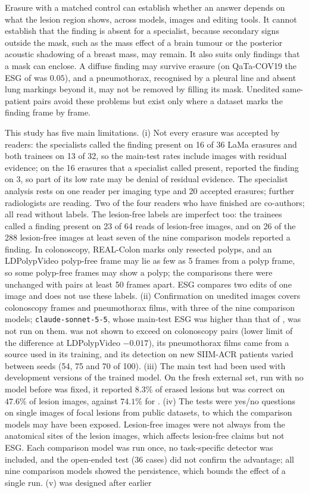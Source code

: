Erasure with a matched control can establish whether an answer depends on what the lesion region shows, across models, images and editing tools. It cannot establish that the finding is absent for a specialist, because secondary signs outside the mask, such as the mass effect of a brain tumour or the posterior acoustic shadowing of a breast mass, may remain. It also suits only findings that a mask can enclose. A diffuse finding may survive erasure (on QaTa-COV19 the ESG of \ms{} was $0.05$), and a pneumothorax, recognised by a pleural line and absent lung markings beyond it, may not be removed by filling its mask. Unedited same-patient pairs avoid these problems but exist only where a dataset marks the finding frame by frame.

This study has five main limitations. (i) Not every erasure was accepted by readers: the specialists called the finding present on 16 of 36 LaMa erasures and both trainees on 13 of 32, so the main-test rates include images with residual evidence; on the 16 erasures that a specialist called present, \ms{} reported the finding on 3, so part of its low rate may be denial of residual evidence. The specialist analysis rests on one reader per imaging type and 20 accepted erasures; further radiologists are reading. Two of the four readers who have finished are co-authors; all read without labels. The lesion-free labels are imperfect too: the trainees called a finding present on 23 of 64 reads of lesion-free images, and on 26 of the 288 lesion-free images at least seven of the nine comparison models reported a finding. In colonoscopy, REAL-Colon marks only resected polyps, and an LDPolypVideo polyp-free frame may lie as few as 5 frames from a polyp frame, so some polyp-free frames may show a polyp; the comparisons there were unchanged with pairs at least 50 frames apart. ESG compares two edits of one image and does not use these labels. (ii) Confirmation on unedited images covers colonoscopy frames and pneumothorax films, with three of the nine comparison models; \texttt{claude-sonnet-5-5}, whose main-test ESG was higher than that of \opus, was not run on them. \msn{} was not shown to exceed \gem{} on colonoscopy pairs (lower limit of the difference at LDPolypVideo $-0.017$), its pneumothorax films came from a source used in its training, and its detection on new SIIM-ACR patients varied between seeds (54, 75 and 70 of 100). (iii) The main test had been used with development versions of the trained model. On the fresh external set, run with no model before \ms{} was fixed, it reported $8.3\%$ of erased lesions but was correct on $47.6\%$ of lesion images, against $74.1\%$ for \gem. (iv) The tests were yes/no questions on single images of focal lesions from public datasets, to which the comparison models may have been exposed. Lesion-free images were not always from the anatomical sites of the lesion images, which affects lesion-free claims but not ESG. Each comparison model was run once, no task-specific detector was included, and the open-ended test (36 cases) did not confirm the advantage; all nine comparison models showed the persistence, which bounds the effect of a single run. (v) \msn{} was designed after earlier 